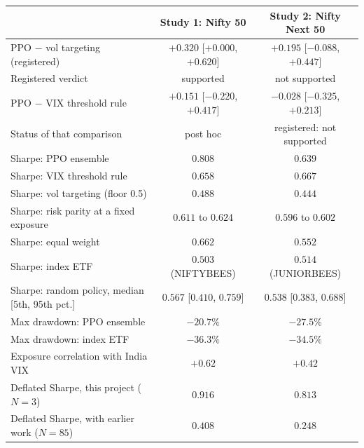 \begin{tabular}{lcc}
\toprule
 & Study 1: Nifty 50 & Study 2: Nifty Next 50 \\
\midrule
PPO $-$ vol targeting (registered) & $+0.320$ [$+0.000$, $+0.620$] & $+0.195$ [$-0.088$, $+0.447$] \\
\quad Registered verdict & supported & not supported \\
PPO $-$ VIX threshold rule & $+0.151$ [$-0.220$, $+0.417$] & $-0.028$ [$-0.325$, $+0.213$] \\
\quad Status of that comparison & post hoc & registered: not supported \\
\midrule
Sharpe: PPO ensemble & $0.808$ & $0.639$ \\
Sharpe: VIX threshold rule & $0.658$ & $0.667$ \\
Sharpe: vol targeting (floor 0.5) & $0.488$ & $0.444$ \\
Sharpe: risk parity at a fixed exposure & $0.611$ to $0.624$ & $0.596$ to $0.602$ \\
Sharpe: equal weight & $0.662$ & $0.552$ \\
Sharpe: index ETF & $0.503$ (NIFTYBEES) & $0.514$ (JUNIORBEES) \\
Sharpe: random policy, median [5th, 95th pct.] & $0.567$ [$0.410$, $0.759$] & $0.538$ [$0.383$, $0.688$] \\
\midrule
Max drawdown: PPO ensemble & $-20.7\%$ & $-27.5\%$ \\
Max drawdown: index ETF & $-36.3\%$ & $-34.5\%$ \\
Exposure correlation with India VIX & $+0.62$ & $+0.42$ \\
Deflated Sharpe, this project ($N=3$) & $0.916$ & $0.813$ \\
Deflated Sharpe, with earlier work ($N=85$) & $0.408$ & $0.248$ \\
\bottomrule
\end{tabular}
